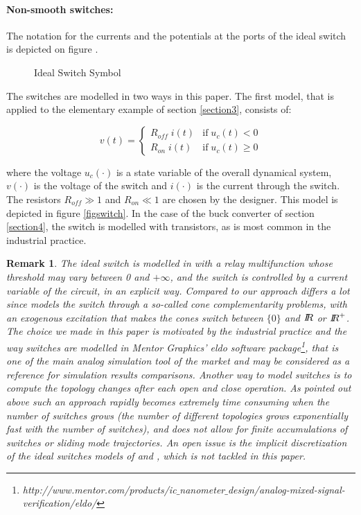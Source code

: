 \documentclass{article}
\def\geq{\geqslant}
\newtheorem{remark}{Remark}
\begin{document}
\paragraph{Non-smooth switches:}The notation for the currents and the potentials at the ports of
the ideal switch is depicted on figure \cite{fig:IDEAL_SWITCH}.


\begin{figure}
  \centering
  \scalebox{0.7}{
  
  }
  \caption{Ideal Switch Symbol}
  \label{fig:IDEAL_SWITCH}
\end{figure}
The switches are modelled in two ways in this paper. The first model, that is applied to the elementary example of section \ref{section3}, consists of:

\begin{equation}\label{switchmodel1}
v(t)=\left\{\begin{array}{ll} R_{off}\; i(t) & \mbox{if}\;u_{c}(t) < 0 \\   R_{on}\; i(t) & \mbox{if}\;u_{c}(t) \geq  0  \end{array}\right.
\end{equation} 

where the voltage $u_{c}(\cdot)$ is a state variable of the overall dynamical system, $v(\cdot)$ is the voltage of the switch and $i(\cdot)$ is the current through the switch. The resistors $R_{off} \gg 1$ and $R_{on} \ll 1$ are chosen by the designer. This model is depicted in figure \ref{figswitch}. In the case of the buck converter of section \ref{section4}, the switch is modelled with transistors, as is most common in the industrial practice. 




\begin{remark}
  The  ideal switch is modelled in \cite{glocker2005} with a relay multifunction whose threshold may vary between 0 and $+\infty$, and the switch is controlled by a current variable of the circuit, in an explicit way. Compared to \cite{vasca2009} our approach differs a lot since \cite{vasca2009} models the switch through a so-called cone complementarity problems, with an exogenous excitation that makes the cones switch between $\{0\}$ and $\mbox{\rm $I\!\!R$}$ or $\mbox{\rm $I\!\!R$}^{+}$. The choice we made in this paper is motivated by the industrial practice and the way switches are modelled in Mentor Graphics' {\sc eldo} software package\footnote{http://www.mentor.com/products/ic$\_$nanometer$\_$design/analog-mixed-signal-verification/eldo/}, that is one of the main analog simulation tool of the market and may be considered as a reference for simulation results comparisons. Another way to model switches is to compute the topology changes after each open and close operation. As pointed out above such an approach rapidly becomes extremely time consuming when the number of switches grows (the number of different topologies grows exponentially fast with the number of switches), and does not allow for finite accumulations of switches or sliding mode trajectories. An open issue is the implicit discretization of the ideal switches models of \cite{glocker2005} and \cite{vasca2009}, which is not tackled in this paper. 
\end{remark}
\end{document}
